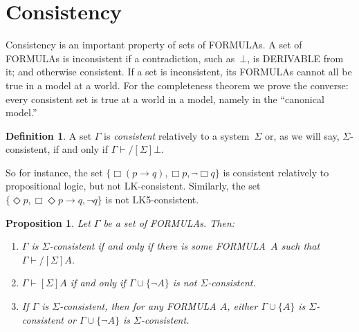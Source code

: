 \documentclass[10pt,a4paper]{article}
\newcommand*{\olup}[1]{\MakeUppercase{#1}}
\theoremstyle{plain}
\newtheorem{prop}[thm]{Proposition}
\theoremstyle{definition}
\newtheorem{defn}[thm]{Definition}
\theoremstyle{remark}
\newcommand*{\olfileid}[3]{}
\newcommand*{\olsection}[1]{\section*{#1}}
\newcommand*{\olchapter}[3]{}
\newcommand*{\olimport}[1]{}
\newcommand*{\ollabel}[1]{\label{#1}}
\providecommand{\lif}{\mathbin{\rightarrow}}
\providecommand{\lfalse}{\bot}
\providecommand{\Proves}{\mathrel{\vdash}}
\providecommand{\Log}{\ensuremath{\mathrm{L}}}
\begin{document}



\olchapter{nml}{prf}{Axiomatic \usetoken{P}{derivation}}

\olimport{introduction}
\olimport{normal-logics}
\olimport{logics-proofs}
\olimport{proofs-in-K}
\olimport{derived-rules}
\olimport{more-proofs-in-K}
\olimport{duals}
\olimport{proofs-modal-systems}
\olimport{soundness}
\olimport{systems-distinct}
\olimport{provability-from-set}
\olimport{provability-properties}
\olimport{consistency}

\OLEndChapterHook






\olfileid{nml}{prf}{con}

\olsection{Consistency}

Consistency is an important property of sets of \olup{formula}s. A set of
\olup{formula}s is inconsistent if a contradiction, such as~$\lfalse$, is
\olup{derivable} from it; and otherwise consistent. If a set is
inconsistent, its \olup{formula}s cannot all be true in a model at a
world. For the completeness theorem we prove the converse: every
consistent set is true at a world in a model, namely in the ``canonical
model.''

\begin{defn}
  A set $\Gamma$ is \emph{consistent} relatively to a system~$\Sigma$
  or, as we will say, $\Sigma$-consistent, if and only if $\Gamma
  \Proves/[\Sigma] \lfalse$.
\end{defn}

So for instance, the set $\{ \Box(p \lif q), \Box p, \lnot\Box q \}$ is
consistent relatively to propositional logic, but not
\Log{K}-consistent. Similarly, the set $\{ \Diamond p, \Box\Diamond
p \lif q, \lnot q \}$ is not \Log{K5}-consistent.

\begin{prop}\ollabel{prop:consistencyfacts}
  Let $\Gamma$ be a set of \olup{formula}s. Then:
  \begin{enumerate}
  \item $\Gamma$ is $\Sigma$-consistent if and only if there is
    some \olup{formula}~$A$ such that $\Gamma \Proves/[\Sigma]
    A$.
  \item \ollabel{prop:consistencyfacts-b}%
    $\Gamma \Proves[\Sigma] A$ if and only if $\Gamma \cup \{
    \lnot A \}$ is not $\Sigma$-consistent.
  \item \ollabel{prop:consistencyfacts-c}%
    If $\Gamma$ is $\Sigma$-consistent, then for any \olup{formula}
    $A$, either $\Gamma \cup \{ A \}$ is
    $\Sigma$-consistent or $\Gamma \cup \{ \lnot A \}$ is
    $\Sigma$-consistent.
  \end{enumerate}
\end{prop}
\end{document}
